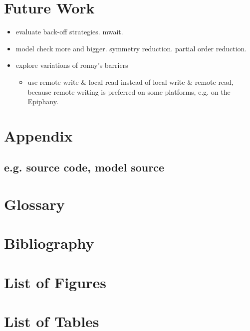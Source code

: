 \documentclass[a4paper, 10pt]{article}
\begin{document}
\section{Future Work}
\begin{itemize}
	\item evaluate back-off strategies. mwait.
	\item model check more and bigger. symmetry reduction. partial order reduction.
	\item explore variations of ronny's barriers
		\begin{itemize}
			\item use remote write \& local read instead of local write \& remote read, because remote writing is preferred on some platforms, e.g. on the Epiphany\cite{epiphany}.
		\end{itemize}
\end{itemize}


\appendix

\pagebreak
\section{Appendix}
\subsection{e.g. source code, model source}

\pagebreak
\section{Glossary}

\pagebreak
\section{Bibliography}
\renewcommand\refname{\vskip -1cm} %
\nocite{*} %

{}

\pagebreak
\section{List of Figures}
\renewcommand{\listfigurename}{\vskip -1cm} %
\listoffigures

\pagebreak
\section{List of Tables}
\renewcommand{\listtablename}{\vskip -1cm} %
\listoftables
\end{document}

